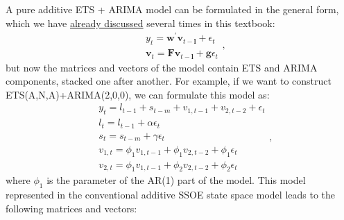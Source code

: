 \documentclass[
]{book}
\theoremstyle{definition}
\theoremstyle{definition}
\theoremstyle{definition}
\theoremstyle{definition}
\theoremstyle{remark}
\begin{document}
A pure additive ETS + ARIMA model can be formulated in the general form, which we have \protect\hyperlink{ADAMETSPureAdditive}{already discussed} several times in this textbook:
\begin{equation*}
  \begin{aligned}
    &{y}_{t} = \mathbf{w}^\prime \mathbf{v}_{t-\mathbf{l}} + \epsilon_t \\
    &\mathbf{v}_{t} = \mathbf{F} \mathbf{v}_{t-\mathbf{l}} + \mathbf{g} \epsilon_t
  \end{aligned},
\end{equation*}
but now the matrices and vectors of the model contain ETS and ARIMA components, stacked one after another. For example, if we want to construct ETS(A,N,A)+ARIMA(2,0,0), we can formulate this model as:
\begin{equation}
  \begin{aligned}
    &{y}_{t} = l_{t-1} + s_{t-m} + v_{1,t-1} + v_{2,t-2} + \epsilon_t \\
    &l_t = l_{t-1} + \alpha \epsilon_t \\
    &s_t = s_{t-m} + \gamma \epsilon_t \\
    &v_{1,t} = \phi_1 v_{1,t-1} + \phi_1 v_{2,t-2} + \phi_1 \epsilon_t \\
    &v_{2,t} = \phi_1 v_{1,t-1} + \phi_2 v_{2,t-2} + \phi_2 \epsilon_t 
  \end{aligned},
  \label{eq:ADAMETSARIMAANA100}
\end{equation}
where \(\phi_1\) is the parameter of the AR(1) part of the model. This model represented in the conventional additive SSOE state space model leads to the following matrices and vectors:
\end{document}
